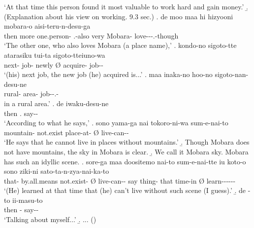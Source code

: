 		`At that time this person found it most valuable to work hard and gain money.'
 \b. (Explanation about his view on working. 9.3 sec.)
 \bg. de moo  maa  hi hizyooni mobara-o aisi-teru-n-desu-ga \\
 	then more one.person-  .-also  very Mobara- love---.-though \\
	`The other one, who also loves Mobara (a place name),'
 \bg. kondo-no sigoto-tte atarasiku \EM{\O} tui-ta sigoto-tteiuno-wa \\
 		next- job- newly {\O} acquire- job-- \\
		`(his) next job, the new job (he) acquired is...'
 \bg. maa inaka-no hoo-no sigoto-nan-desu-ne \\
 	 rural- area- job--.- \\
	in a rural area.'
 \bg. de  iwaku-desu-ne \\
 	then . say-- \\
	`According to what he says,'
 \bg. sono yama-ga nai tokoro-ni-wa \EM{\O} sum-e-nai-to \\
 	 mountain- not.exist place-at- {\O} live-can-- \\
 	`He says that he cannot live in places without mountains.'
 \b. Though Mobara does not have mountains, the sky in Mobara is clear.
 \b. We call it Mobara sky. Mobara has such an idyllic scene.
 \bg. sore-ga maa doositemo nai-to \EM{\O} sum-e-nai-tte iu koto-o sono ziki-ni \EM{\O} sato-ta-n-zya-nai-ka-to \\
 	that-  by.all.means not.exist- {\O} live-can-- say thing- that time-in {\O} learn------ \\
	`(He) learned at that time that (he) can't live without such scene (I guess).'
 \b. de -to ii-masu-to \\
 	then - say-- \\
	`Talking about myself...'
 \b. ...
   \hfill{()}
